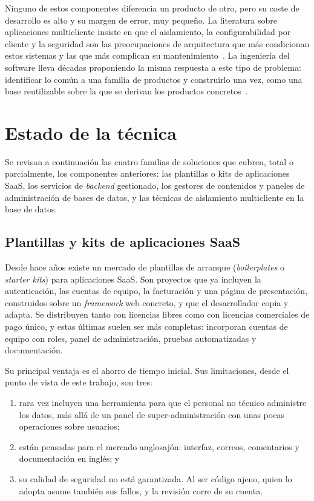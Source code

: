 Ninguno de estos componentes diferencia un producto de otro, pero su coste
de desarrollo es alto y su margen de error, muy pequeño. La literatura sobre
aplicaciones multicliente insiste en que el aislamiento, la configurabilidad
por cliente y la seguridad son las preocupaciones de arquitectura que más
condicionan estos sistemas y las que más complican su
mantenimiento~\cite{bezemer2010multitenant,krebs2012multitenancy}. La
ingeniería del software lleva décadas proponiendo la misma respuesta a este
tipo de problema: identificar lo común a una familia de productos y
construirlo una vez, como una base reutilizable sobre la que se derivan los
productos concretos~\cite{clements2001spl}.

\section{Estado de la técnica}
\label{sec:ctx-estado-tecnica}

Se revisan a continuación las cuatro familias de soluciones que cubren, total
o parcialmente, los componentes anteriores: las plantillas o kits de
aplicaciones SaaS, los servicios de \textit{backend} gestionado, los gestores
de contenidos y paneles de administración de bases de datos, y las técnicas de
aislamiento multicliente en la base de datos.

\subsection{Plantillas y kits de aplicaciones SaaS}
\label{sec:ctx-kits}

Desde hace años existe un mercado de plantillas de arranque
(\textit{boilerplates} o \textit{starter kits}) para aplicaciones SaaS. Son
proyectos que ya incluyen la autenticación, las cuentas de equipo, la
facturación y una página de presentación, construidos sobre un
\textit{framework} web concreto, y que el desarrollador copia y adapta. Se
distribuyen tanto con licencias libres como con licencias comerciales de pago
único, y estas últimas suelen ser más completas: incorporan cuentas de equipo
con roles, panel de administración, pruebas automatizadas y documentación.

Su principal ventaja es el ahorro de tiempo inicial. Sus limitaciones, desde
el punto de vista de este trabajo, son tres:

\begin{enumerate}
  \item rara vez incluyen una herramienta para que el personal no técnico
        administre los datos, más allá de un panel de super-administración
        con unas pocas operaciones sobre usuarios;
  \item están pensadas para el mercado anglosajón: interfaz, correos,
        comentarios y documentación en inglés; y
  \item su calidad de seguridad no está garantizada. Al ser código ajeno,
        quien lo adopta asume también sus fallos, y la revisión corre de su
        cuenta.
\end{enumerate}

